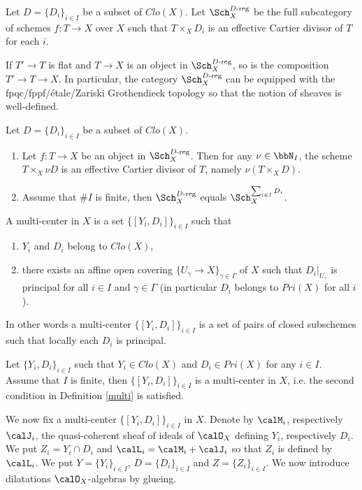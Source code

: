 \documentclass[10pt]{alggeom}
\theoremstyle{definition}
\numberwithin{equation}{section}
\begin{document}
\label{defcatreg} Let $D= \{ D_i \} _{i \in I}$ be a subset of $Clo (X)$. Let $\Sch _X ^{D\text{-reg}}$ be the full subcategory of schemes $f:T \to X $ over $X$ such that    $T \times _X D_i$ is an effective Cartier divisor of $T$ for each $i$. 
\xdefi 



If $T'\to T$ is flat and $T\to X$ is an object in $\Sch _X ^{D\text{-reg}}$, so is the composition $T'\to T\to X$.
In particular, the category $\Sch _X ^{D\text{-reg}}$ can be equipped with the fpqc/fppf/\'etale/Zariski Grothendieck topology so that the notion of sheaves is well-defined.


\fact[\cite{Ma23d}] \label{fact3.3}  Let $D= \{ D_i \} _{i \in I}$ be a subset of $Clo (X)$. 
 \begin{enumerate} \item Let $f:T\to X$ be an object in $\Sch _X ^{D\text{-reg}}$. Then for any $\nu \in \bbN _I$, the scheme $T \times _X \nu D$ is an effective Cartier divisor of $T$, namely $\nu ( T \times _X D)$.
\item Assume that $\#I$ is finite, then $\Sch _X ^{D\text{-reg}}$ equals $\Sch _X^{\sum _{i \in I} D_i}$.
\end{enumerate}
\xfact

 \label{multi}
 A multi-center in $X$ is a set $\{ [Y_i , D_i ]\} _{i \in I} $ such that \begin{enumerate}
 \item  $Y_i $ and $ D_i$ belong to $ Clo (X) $,
 \item there exists an affine open covering $\{ U_{\gamma } \to X \}_{\gamma \in \Gamma} $ of $X$ such that $D_i |_{U_\gamma}$ is principal for all $i \in I $ and $\gamma \in \Gamma $ (in particular $D_i $ belongs to $Pri (X)$ for all $i$). \end{enumerate}
 In other words a multi-center  $\{ [Y_i , D_i ]\} _{i \in I} $ is a set of pairs of closed subschemes such that locally each $D_i$ is principal.
\xdefi

\rema Let $\{ Y_i , D_i \} _{i \in I} $ such that   $Y_i \in Clo (X) $ and $D_i \in Pri (X)$ for any $i \in I$. Assume that $I$ is finite, then $\{ [Y_i , D_i ]\} _{i \in I} $ is a multi-center in $X$, i.e. the second condition in Definition \ref{multi} is satisfied.
\xrema 

We now fix a multi-center $\{ [Y_i , D_i ]\} _{i \in I} $ in $X$.
 Denote by
$\calM_i$, respectively $\calJ_i$,  the quasi-coherent sheaf
of ideals of $\calO_X$ defining   $Y_i$, respectively $D_i$. We put $Z_i = Y_i \cap D_i$ and $\calL_i = \calM _i + \calJ _i $ so that $Z_i$ is defined by $\calL _i$. We put $Y= \{Y_i \}_{i \in I}$, $D= \{D_i \}_{i \in I}$ and $Z= \{ Z_i \}_{i \in I}$.
We now introduce dilatations $\calO _X$-algebras by glueing. 
\end{document}
